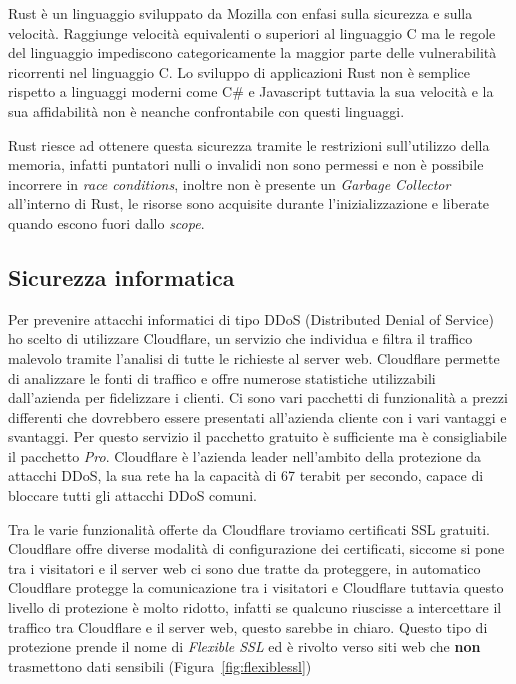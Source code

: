 Rust \`e un linguaggio sviluppato da Mozilla con enfasi sulla sicurezza e sulla velocit\`a. Raggiunge velocit\`a equivalenti o superiori al linguaggio C ma le regole del linguaggio impediscono categoricamente la maggior parte delle vulnerabilit\`a ricorrenti nel linguaggio C\@. Lo sviluppo di applicazioni Rust non \`e semplice rispetto a linguaggi moderni come C\# e Javascript tuttavia la sua velocit\`a e la sua affidabilit\`a non \`e neanche confrontabile con questi linguaggi. %

Rust riesce ad ottenere questa sicurezza tramite le restrizioni sull'utilizzo della memoria, infatti puntatori nulli o invalidi non sono permessi e non \`e possibile incorrere in \emph{race conditions}, inoltre non \`e presente un \emph{Garbage Collector} all'interno di Rust, le risorse sono acquisite durante l'inizializzazione e liberate quando escono fuori dallo \emph{scope}.

\subsection{Sicurezza informatica}%
\label{sub:sicurezza_informatica}

Per prevenire attacchi informatici di tipo DDoS (Distributed Denial of Service) ho scelto di utilizzare Cloudflare, un servizio che individua e filtra il traffico malevolo tramite l'analisi di tutte le richieste al server web. Cloudflare permette di analizzare le fonti di traffico e offre numerose statistiche utilizzabili dall'azienda per fidelizzare i clienti. Ci sono vari pacchetti di funzionalit\`a a prezzi differenti che dovrebbero essere presentati all'azienda cliente con i vari vantaggi e svantaggi. Per questo servizio il pacchetto gratuito \`e sufficiente ma \`e consigliabile il pacchetto \emph{Pro}. Cloudflare \`e l'azienda leader nell'ambito della protezione da attacchi DDoS, la sua rete ha la capacit\`a di 67 terabit per secondo, capace di bloccare tutti gli attacchi DDoS comuni. %

Tra le varie funzionalit\`a offerte da Cloudflare troviamo certificati SSL gratuiti. Cloudflare offre diverse modalit\`a di configurazione dei certificati, siccome si pone tra i visitatori e il server web ci sono due tratte da proteggere, in automatico Cloudflare protegge la comunicazione tra i visitatori e Cloudflare tuttavia questo livello di protezione \`e molto ridotto, infatti se qualcuno riuscisse a intercettare il traffico tra Cloudflare e il server web, questo sarebbe in chiaro. Questo tipo di protezione prende il nome di \emph{Flexible SSL} ed \`e rivolto verso siti web che \textbf{non} trasmettono dati sensibili (Figura~\ref{fig:flexiblessl}) %

